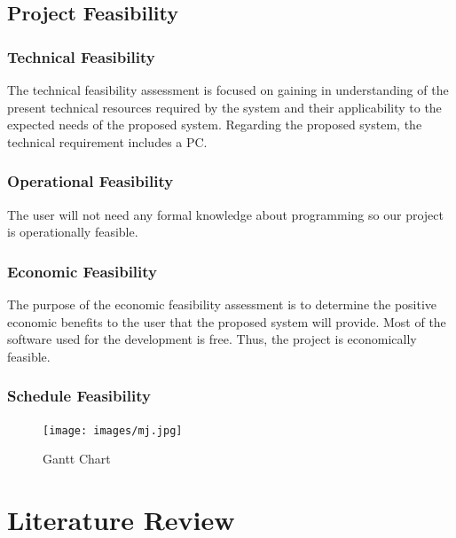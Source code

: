 \section{Project Feasibility}
\vspace{-18pt}
\subsection{Technical Feasibility}
\vspace{-18pt}
The technical feasibility assessment is focused on gaining in understanding of the present technical resources required by the system and their applicability to the expected needs of the proposed system. Regarding the proposed system, the technical requirement includes a PC.
\vspace{-18pt}
\subsection{Operational Feasibility}
\vspace{-18pt}
The user will not need any formal knowledge about programming so our project is operationally feasible.
\vspace{-18pt}
\subsection{Economic Feasibility}
\vspace{-18pt}
The purpose of the economic feasibility assessment is to determine the positive economic benefits to the user that the proposed system will provide. Most of the software used for the development is free. Thus, the project is economically feasible.
\vspace{-18pt}
\subsection{Schedule Feasibility}
\begin{figure}[!h] %
\begin{center}
	\texttt{[image: images/mj.jpg]} 
	\caption{Gantt Chart} %
	\label{figGanttChart} %
\end{center}
\end{figure}
\chapter{Literature Review}
\vspace{-18pt}
